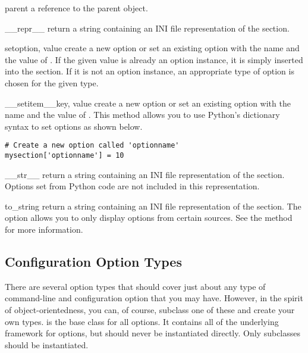 \begin{memberdesc}[ConfigSection]{parent}
a reference to the parent  object.
\end{memberdesc}

\begin{methoddesc}[ConfigSection]{__repr__}{}
return a string containing an INI file representation of the section.
\end{methoddesc}

\begin{methoddesc}[ConfigSection]{set}{option, value}
create a new option or set an existing option with the name 
 and the value of .
If the given value is already an option instance, it is simply inserted
into the section.  If it is not an option instance, an appropriate type
of option is chosen for the given type.
\end{methoddesc}

\begin{methoddesc}[ConfigSection]{__setitem__}{key, value}
create a new option or set an existing option with the name  and
the value of .  This method allows you to use Python's 
dictionary syntax to set options as shown below.
\begin{verbatim}
# Create a new option called 'optionname'
mysection['optionname'] = 10
\end{verbatim}
\end{methoddesc}

\begin{methoddesc}[ConfigSection]{__str__}{}
return a string containing an INI file representation of the section.
Options set from Python code are not included in this representation.
\end{methoddesc}

\begin{methoddesc}[ConfigSection]{to_string}{}
return a string containing an INI file representation of the section.
The  option allows you to only display options from 
certain sources.  See the  method for more
information.
\end{methoddesc}


\subsection{Configuration Option Types}

There are several option types that should cover just about any type 
of command-line and configuration option that you may have.  However,
in the spirit of object-orientedness, you can, of course, subclass
one of these and create your own types.   is the 
base class for all options.  It contains all of the underlying framework
for options, but should never be instantiated directly.  Only subclasses
should be instantiated.

